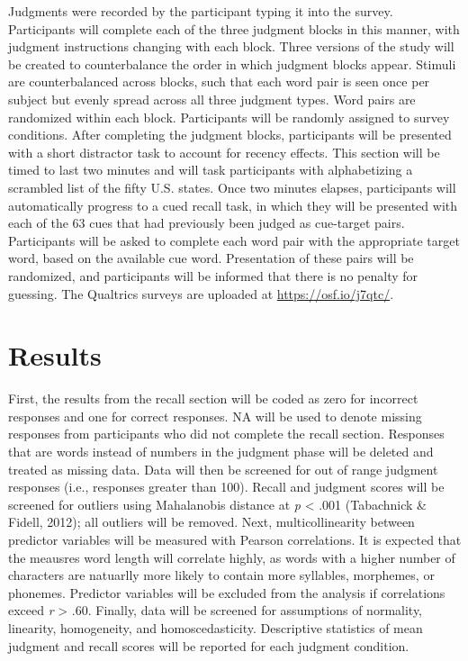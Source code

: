 \documentclass[english,man]{apa6}
\theoremstyle{definition}
\theoremstyle{definition}
\theoremstyle{definition}
\theoremstyle{remark}
\begin{document}
Judgments were recorded by the participant typing it into the survey.
Participants will complete each of the three judgment blocks in this
manner, with judgment instructions changing with each block. Three
versions of the study will be created to counterbalance the order in
which judgment blocks appear. Stimuli are counterbalanced across blocks,
such that each word pair is seen once per subject but evenly spread
across all three judgment types. Word pairs are randomized within each
block. Participants will be randomly assigned to survey conditions.
After completing the judgment blocks, participants will be presented
with a short distractor task to account for recency effects. This
section will be timed to last two minutes and will task participants
with alphabetizing a scrambled list of the fifty U.S. states. Once two
minutes elapses, participants will automatically progress to a cued
recall task, in which they will be presented with each of the 63 cues
that had previously been judged as cue-target pairs. Participants will
be asked to complete each word pair with the appropriate target word,
based on the available cue word. Presentation of these pairs will be
randomized, and participants will be informed that there is no penalty
for guessing. The Qualtrics surveys are uploaded at
\url{https://osf.io/j7qtc/}.

\section{Results}\label{results}

First, the results from the recall section will be coded as zero for
incorrect responses and one for correct responses. NA will be used to
denote missing responses from participants who did not complete the
recall section. Responses that are words instead of numbers in the
judgment phase will be deleted and treated as missing data. Data will
then be screened for out of range judgment responses (i.e., responses
greater than 100). Recall and judgment scores will be screened for
outliers using Mahalanobis distance at \emph{p} \textless{} .001
(Tabachnick \& Fidell, 2012); all outliers will be removed. Next,
multicollinearity between predictor variables will be measured with
Pearson correlations. It is expected that the meausres word length will
correlate highly, as words with a higher number of characters are
natuarlly more likely to contain more syllables, morphemes, or phonemes.
Predictor variables will be excluded from the analysis if correlations
exceed \emph{r} \textgreater{} .60. Finally, data will be screened for
assumptions of normality, linearity, homogeneity, and homoscedasticity.
Descriptive statistics of mean judgment and recall scores will be
reported for each judgment condition.
\end{document}
